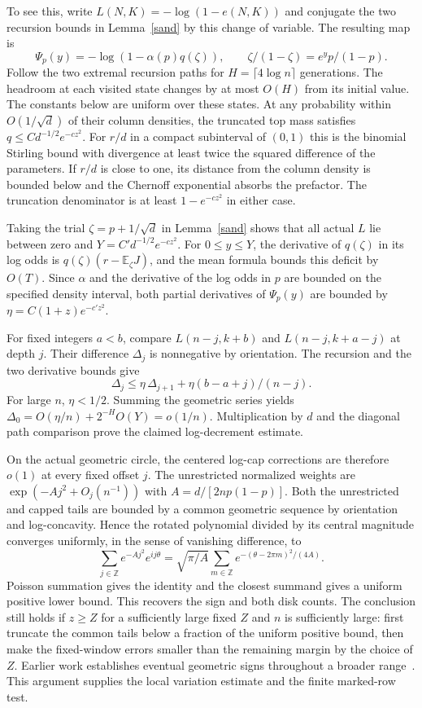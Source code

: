 \documentclass[11pt]{article}
\newcommand{\E}{\mathbb E}
\begin{document}
To see this, write $L(N,K)=-\log(1-e(N,K))$ and conjugate the two recursion bounds in Lemma~\ref{sand} by this change of variable. The resulting map is
\[
\Psi_p(y)=-\log(1-\alpha(p)q(\zeta)),\qquad
  \zeta/(1-\zeta)=e^y p/(1-p).
\]
Follow the two extremal recursion paths for $H=\lceil4\log n\rceil$ generations. The headroom at each visited state changes by at most $O(H)$ from its initial value. The constants below are uniform over these states. At any probability within $O(1/\sqrt d)$ of their column densities, the truncated top mass satisfies $q\le C d^{-1/2}e^{-c z^2}$. For $r/d$ in a compact subinterval of $(0,1)$ this is the binomial Stirling bound with divergence at least twice the squared difference of the parameters. If $r/d$ is close to one, its distance from the column density is bounded below and the Chernoff exponential absorbs the prefactor. The truncation denominator is at least $1-e^{-c z^2}$ in either case.

Taking the trial $\zeta=p+1/\sqrt d$ in Lemma~\ref{sand} shows that all actual $L$ lie between zero and $Y=C'd^{-1/2}e^{-cz^2}$. For $0\le y\le Y$, the derivative of $q(\zeta)$ in its log odds is $q(\zeta)(r-\E_\zeta J)$, and the mean formula bounds this deficit by $O(T)$. Since $\alpha$ and the derivative of the log odds in $p$ are bounded on the specified density interval, both partial derivatives of $\Psi_p(y)$ are bounded by $\eta=C(1+z)e^{-c'z^2}$.

For fixed integers $a<b$, compare $L(n-j,k+b)$ and $L(n-j,k+a-j)$ at depth $j$. Their difference $\Delta_j$ is nonnegative by orientation. The recursion and the two derivative bounds give
\[
\Delta_j\le\eta\,\Delta_{j+1}+\eta(b-a+j)/(n-j).
\]
For large $n$, $\eta<1/2$. Summing the geometric series yields $\Delta_0=O(\eta/n)+2^{-H}O(Y)=o(1/n)$. Multiplication by $d$ and the diagonal path comparison prove the claimed log-decrement estimate.

On the actual geometric circle, the centered log-cap corrections are therefore $o(1)$ at every fixed offset $j$. The unrestricted normalized weights are $\exp(-A j^2+O_j(n^{-1}))$ with $A=d/[2np(1-p)]$. Both the unrestricted and capped tails are bounded by a common geometric sequence by orientation and log-concavity. Hence the rotated polynomial divided by its central magnitude converges uniformly, in the sense of vanishing difference, to
\[
\sum_{j\in\mathbb Z}e^{-Aj^2}e^{ij\theta}
=\sqrt{\pi/A}\sum_{m\in\mathbb Z}e^{-(\theta-2\pi m)^2/(4A)} .
\]
Poisson summation gives the identity and the closest summand gives a uniform positive lower bound. This recovers the sign and both disk counts. The conclusion still holds if $z\ge Z$ for a sufficiently large fixed $Z$ and $n$ is sufficiently large: first truncate the common tails below a fraction of the uniform positive bound, then make the fixed-window errors smaller than the remaining margin by the choice of $Z$. Earlier work establishes eventual geometric signs throughout a broader range~\cite{earlier}. This argument supplies the local variation estimate and the finite marked-row test.
\end{document}
